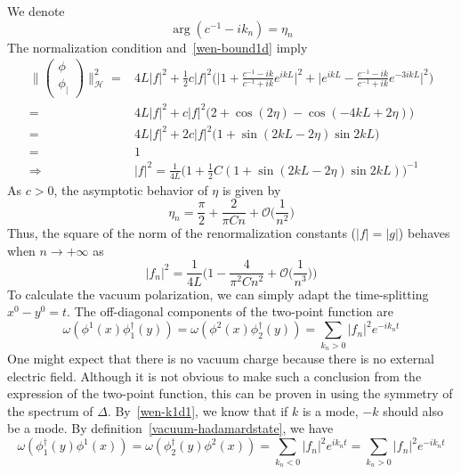 We denote
\begin{equation*}
\arg(c^{-1} - ik_n) = \eta_n
\end{equation*}
The normalization condition and~\cref{wen-bound1d} imply
\begin{equation*}
\begin{split}
\Big\| \begin{pmatrix} \phi \\  \phi_| \end{pmatrix} \Big\|^2_{\mathcal{H}}  = &
4L |f|^2 + \frac 1 2 c |f|^2 \bigg( \Big| 1 + \frac{c^{-1} - ik}{c^{-1} + ik}e^{ikL} \Big|^2
+ \Big| e^{ikL} - \frac{c^{-1} - ik}{c^{-1} + ik}e^{-3ikL} \Big|^2
\bigg) \\
%
=& 4L |f|^2 + c |f|^2 \big(2 + \cos(2\eta) - \cos(-4kL + 2\eta) \big) \\
%
=& 4L |f|^2 +2 c |f|^2 \big(1 + \sin(2kL - 2\eta) \sin 2kL  \big) \\
= & 1 \\
\Rightarrow &
|f|^2 = \frac{1}{4L} \Big( 1 + \frac 1 2 C (1 + \sin(2kL-2\eta) \sin 2kL ) \Big)^{-1}
\end{split}
\end{equation*}
As $c> 0 $, the asymptotic behavior of $\eta$ is given by
\begin{equation*}
\eta_n = \frac \pi 2 + \frac{2}{\pi Cn} + \mathcal{O}\big(\frac{1}{n^2}\big)
\end{equation*}
Thus, the square of the norm of the renormalization constants ($|f| = |g|$) behaves when $n\rightarrow +\infty$ as
\begin{equation*}
|f_n|^2 = 
\frac{1}{4L}\Big( 1 - \frac{4}{\pi^2C n^2} + \mathcal{O}\big(\frac{1}{n^3}\big) \Big)
\end{equation*}
To calculate the vacuum polarization, we can simply adapt the time-splitting $x^0 - y^0 = t$. 
The off-diagonal components of the two-point function are
\begin{equation*}
\omega(\phi^1(x)\phi^\dagger_1(y)) = \omega(\phi^2(x)\phi^\dagger_2(y)) = 
 \sum_{k_n>0} |f_n|^2 e^{-ik_nt}
\end{equation*} 
One might expect that there is no vacuum charge because there is no external electric field. 
Although it is not obvious to make such a conclusion from the expression of the two-point function, 
this can be proven in using the symmetry of the spectrum of $\Delta$.
By~\cref{wen-k1d1}, we know that if $k$ is a mode, $-k$ should also be a mode.
By definition~\cref{vacuum-hadamardstate}, we have
\begin{equation*}
\omega(\phi_1^\dagger(y)\phi^1(x)) = \omega(\phi_2^\dagger(y)\phi^2(x)) = 
 \sum_{k_n< 0} |f_n|^2 e^{ik_nt}
= \sum_{k_n>0} |f_n|^2 e^{-ik_nt}
\end{equation*}
